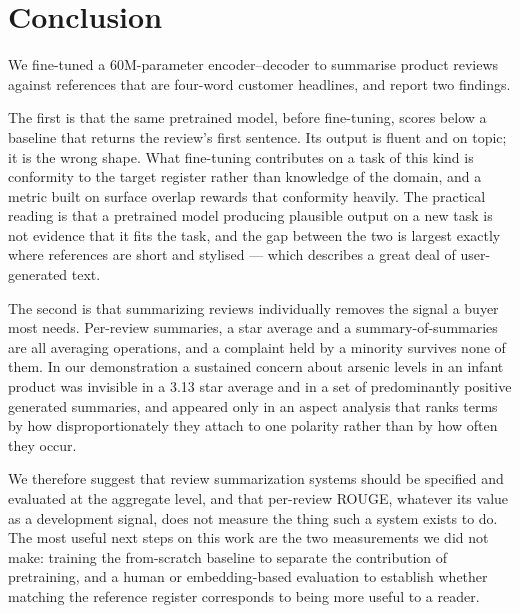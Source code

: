 \section{Conclusion}
\label{sec:conclusion}

We fine-tuned a 60M-parameter encoder--decoder to summarise product reviews
against references that are four-word customer headlines, and report two
findings.

The first is that the same pretrained model, before fine-tuning, scores below a
baseline that returns the review's first sentence. Its output is fluent and on
topic; it is the wrong shape. What fine-tuning contributes on a task of this
kind is conformity to the target register rather than knowledge of the domain,
and a metric built on surface overlap rewards that conformity heavily. The
practical reading is that a pretrained model producing plausible output on a
new task is not evidence that it fits the task, and the gap between the two is
largest exactly where references are short and stylised --- which describes a
great deal of user-generated text.

The second is that summarizing reviews individually removes the signal a buyer
most needs. Per-review summaries, a star average and a summary-of-summaries are
all averaging operations, and a complaint held by a minority survives none of
them. In our demonstration a sustained concern about arsenic levels in an
infant product was invisible in a 3.13 star average and in a set of
predominantly positive generated summaries, and appeared only in an aspect
analysis that ranks terms by how disproportionately they attach to one
polarity rather than by how often they occur.

We therefore suggest that review summarization systems should be specified and
evaluated at the aggregate level, and that per-review ROUGE, whatever its
value as a development signal, does not measure the thing such a system exists
to do. The most useful next steps on this work are the two measurements we did
not make: training the from-scratch baseline to separate the contribution of
pretraining, and a human or embedding-based evaluation to establish whether
matching the reference register corresponds to being more useful to a reader.
